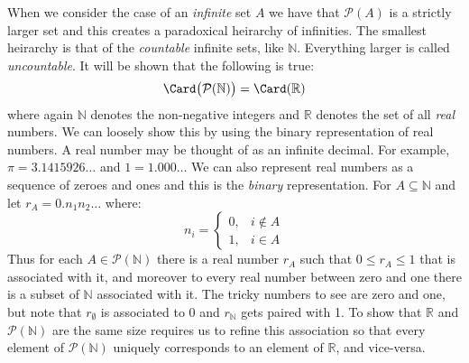         \begin{example}
            When we consider the case of an \textit{infinite} set $A$ we have
            that $\mathcal{P}(A)$ is a strictly larger set and this creates a
            paradoxical heirarchy of infinities. The smallest heirarchy is
            that of the \textit{countable} infinite sets, like $\mathbb{N}$.
            Everything larger is called \textit{uncountable}. It will be
            shown that the following is true:
            \begin{equation}
                \Card\big(\mathcal{P}(\mathbb{N})\big)=
                \Card(\mathbb{R})
            \end{equation}
            where again $\mathbb{N}$ denotes the non-negative integers and
            $\mathbb{R}$ denotes the set of all \textit{real} numbers. We
            can loosely show this by using the binary representation of real
            numbers. A real number may be thought of as an infinite decimal.
            For example, $\pi=3.1415926\dots$ and $1=1.000\dots$ We can
            also represent real numbers as a sequence of zeroes and ones and
            this is the \textit{binary} representation. For
            $A\subseteq\mathbb{N}$ and let $r_{A}=0.n_{1}n_{2}\hdots$ where:
            \begin{equation}
                n_{i}=
                \begin{cases}
                    0,&i\notin{A}\\
                    1,&i\in{A}
                \end{cases}
            \end{equation}
            Thus for each $A\in\mathcal{P}(\mathbb{N})$ there is a real
            number $r_{A}$ such that $0\leq{r}_{A}\leq{1}$ that is
            associated with it, and moreover to every real number between
            zero and one there is a subset of $\mathbb{N}$ associated with
            it. The tricky numbers to see are zero and one, but note that
            $r_{\emptyset}$ is associated to 0 and $r_{\mathbb{N}}$ gets
            paired with 1. To show that $\mathbb{R}$ and
            $\mathcal{P}(\mathbb{N})$ are the same size requires us to
            refine this association so that every element of
            $\mathcal{P}(\mathbb{N})$ uniquely corresponds to an element of
            $\mathbb{R}$, and vice-versa.
        \end{example}
